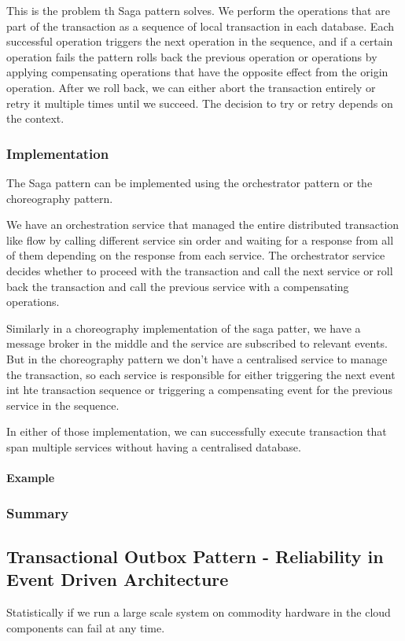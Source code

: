 \documentclass[a4paper, 11pt]{book}
\begin{document}
    This is the problem th Saga pattern solves.
    We perform the operations that are part of the transaction as a sequence of local transaction in each database.
    Each successful operation triggers the next operation in the sequence, and if a certain operation fails the pattern rolls back the previous operation or operations by applying compensating operations that have the opposite effect from the origin operation.
    After we roll back, we can either abort the transaction entirely or retry it multiple times until we succeed.
    The decision to try or retry depends on the context.

    \subsubsection{Implementation}
    The Saga pattern can be implemented using the orchestrator pattern or the choreography pattern.

    We have an orchestration service that managed the entire distributed transaction like flow by calling different service sin order and waiting for a response from all of them depending on the response from each service.
    The orchestrator service decides whether to proceed with the transaction and call the next service or roll back the transaction and call the previous service with a compensating operations.

    Similarly in a choreography implementation of the saga patter, we have a message broker in the middle and the service are subscribed to relevant events.
    But in the choreography pattern we don't have a centralised service to manage the transaction, so each service is responsible for either triggering the next event int hte transaction sequence or triggering a compensating event for the previous service in the sequence.

    In either of those implementation, we can successfully execute transaction that span multiple services without having a centralised database.

    \paragraph{Example}

    \subsubsection{Summary}

    \subsection{Transactional Outbox Pattern - Reliability in Event Driven Architecture}
    Statistically if we run a large scale system on commodity hardware in the cloud components can fail at any time.
\end{document}
